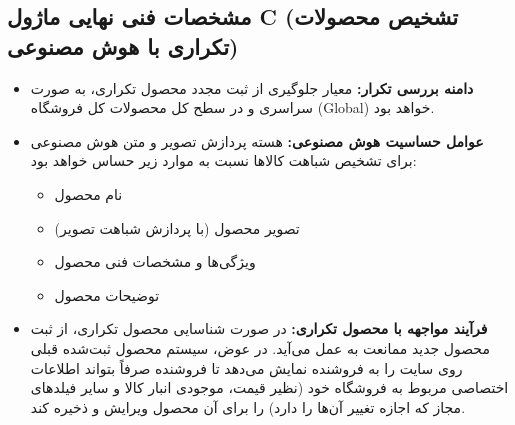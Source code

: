 \documentclass[11pt,a4paper]{article}
\begin{document}
\subsection{مشخصات فنی نهایی ماژول C (تشخیص محصولات تکراری با هوش مصنوعی)}
\begin{itemize}
    \item \textbf{دامنه بررسی تکرار:} معیار جلوگیری از ثبت مجدد محصول تکراری، به صورت سراسری و در سطح کل محصولات کل فروشگاه (Global) خواهد بود.
    \item \textbf{عوامل حساسیت هوش مصنوعی:} هسته پردازش تصویر و متن هوش مصنوعی برای تشخیص شباهت کالاها نسبت به موارد زیر حساس خواهد بود:
    \begin{itemize}
        \item نام محصول
        \item تصویر محصول (با پردازش شباهت تصویر)
        \item ویژگی‌ها و مشخصات فنی محصول
        \item توضیحات محصول
    \end{itemize}
    \item \textbf{فرآیند مواجهه با محصول تکراری:} در صورت شناسایی محصول تکراری، از ثبت محصول جدید ممانعت به عمل می‌آید. در عوض، سیستم محصول ثبت‌شده قبلی روی سایت را به فروشنده نمایش می‌دهد تا فروشنده صرفاً بتواند اطلاعات اختصاصی مربوط به فروشگاه خود (نظیر قیمت، موجودی انبار کالا و سایر فیلدهای مجاز که اجازه تغییر آن‌ها را دارد) را برای آن محصول ویرایش و ذخیره کند.
\end{itemize}
\end{document}

